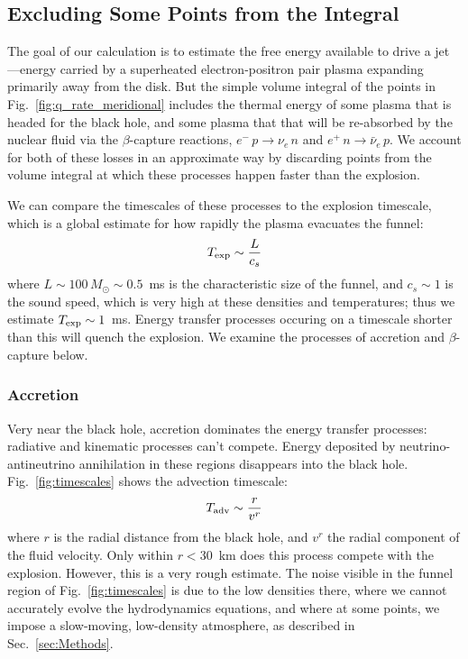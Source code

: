 \subsection{Excluding Some Points from the Integral}
\label{ssec:excluding_pts}

The goal of our calculation is to estimate the free energy available to drive
a jet---energy carried by a superheated electron-positron pair plasma expanding
primarily away from the disk. But the simple volume integral of the points in
Fig.~\ref{fig:q_rate_meridional} includes the thermal energy of some plasma
that is headed for the black hole, and some plasma that that will be re-absorbed
by the nuclear fluid via the $\beta$-capture reactions,
$e^{-}\,p \rightarrow \nu_e\,n$ and
$e^{+}\,n \rightarrow \bar{\nu}_e\,p$.
We account for both of these losses in an approximate way by discarding points
from the volume integral at which these processes happen faster than the
explosion.

We can compare the timescales of these processes to the explosion timescale,
which is a global estimate for how rapidly the plasma evacuates the funnel:
\begin{equation}
  T_{\rm exp} \sim \frac{L}{c_s}
\end{equation}
where $L\sim100\,M_\odot\sim0.5$~ms is the characteristic size of the funnel, and
$c_s\sim1$ is the sound speed, which is very high at these densities and
temperatures;
thus we estimate $T_{\rm exp} \sim 1$~ms.
Energy transfer processes occuring on a timescale shorter than this will quench
the explosion. We examine the processes of accretion and $\beta$-capture below.

\subsubsection{Accretion}
\label{sssc:accretion_timescale}
Very near the black hole, accretion dominates the energy transfer processes:
radiative and kinematic processes can't compete.
Energy deposited by neutrino-antineutrino annihilation in these regions
disappears into the black hole. Fig.~\ref{fig:timescales} shows the
advection timescale:
\begin{equation}
  T_{\rm adv} \sim \frac{r}{v^r}
\end{equation}
where $r$ is the radial distance from the black hole, and $v^r$ the radial
component of the fluid velocity.
Only within $r<30$~km does this process compete with the explosion.
However, this is a very rough estimate. The noise visible in the funnel region
of Fig.~\ref{fig:timescales} is due to the low densities there, where we cannot
accurately evolve the hydrodynamics equations, and where at some points,
we impose a slow-moving, low-density atmosphere, as described in
Sec.~\ref{sec:Methods}.

